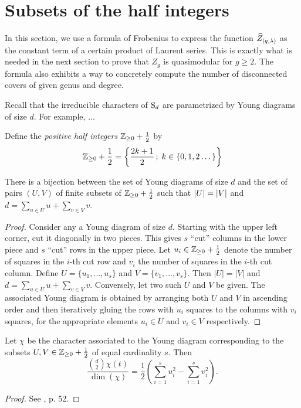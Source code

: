 \section{Subsets of the half integers}

In this section, we use a formula of Frobenius to express the function $\widehat{Z}_{(q,\lambda)}$ as the constant term of a certain product of Laurent series. This is exactly what is needed in the next section to prove that ${Z}_g$ is quasimodular for $g\geq 2$. The formula also exhibits a way to concretely compute the number of disconnected covers of given genus and degree.

Recall that the irreducible characters of $\operatorname{S}_d$ are parametrized by Young diagrams of size $d$. For example, ...

\begin{defi}
 Define the \emph{positive half integers} $\mathbb{Z}_{\geq0}+\frac{1}{2}$ by
 \[
  \mathbb{Z}_{\geq 0}+\frac{1}{2}=\left\{\frac{2k+1}{2}\,;\; k\in\{0,1,2\dotsc\}\right\}
 \]
\end{defi}

\begin{prop} \label{prop:bijection-young}
 There is a bijection between the set of Young diagrams of size $d$ and the set of pairs $(U,V)$ of finite subsets of $\mathbb{Z}_{\geq 0}+\frac{1}{2}$ such that $|U|=|V|$ and $d=\sum_{u\in U}u + \sum_{v\in V}v$.
\end{prop}
\begin{proof}
 Consider any a Young diagram of size $d$. Starting with the upper left corner, cut it diagonally in two pieces. This gives $s$ ``cut'' columns in the lower piece and $s$ ``cut'' rows in the upper piece. Let $u_i\in\mathbb{Z}_{\geq 0}+\frac{1}{2}$ denote the number of squares in the $i$-th cut row and $v_i$ the number of squares in the $i$-th cut column. Define $U=\{u_1,\dotsc,u_s\}$ and $V=\{v_1,\dotsc,v_s\}$. Then $|U|=|V|$ and $d=\sum_{u\in U}u + \sum_{v\in V}v$. Conversely, let two such $U$ and $V$ be given. The associated Young diagram is obtained by arranging both $U$ and $V$ in ascending order and then iteratively gluing the rows with $u_i$ squares to the columns with $v_i$ squares, for the appropriate elements $u_i \in U$ and $v_i \in V$ respectively.
\end{proof}

\begin{prop} \label{prop:frobenius-formula}
 Let $\chi$ be the character associated to the Young diagram corresponding to the subsets $U,V\in\mathbb{Z}_{\geq 0}+\frac{1}{2}$ of equal cardinality $s$. Then
 \[
  \frac{\binom{d}{2} \chi(t)}{\dim(\chi)} = \frac{1}{2}\left(\sum_{i=1}^s u_i^2 - \sum_{i=1}^s v_i^2\right).
 \]
\end{prop}
\begin{proof}
 See \cite{Fulton-Harris91}, p. 52.
\end{proof}

